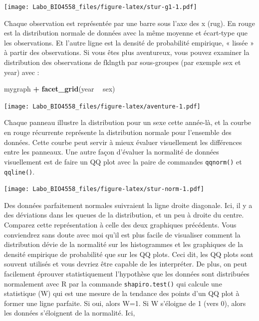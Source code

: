 \documentclass[12pt,]{book}
\newenvironment{Shaded}{\begin{snugshade}}{\end{snugshade}}
\newcommand{\KeywordTok}[1]{\textcolor[rgb]{0.27,0.27,0.27}{\textbf{#1}}}
\newcommand{\NormalTok}[1]{#1}
\newcommand{\OperatorTok}[1]{\textcolor[rgb]{0.43,0.43,0.43}{\textbf{#1}}}
\newcommand{\StringTok}[1]{\textcolor[rgb]{0.5,0.5,0.5}{#1}}
\begin{document}
\texttt{[image: Labo\_BIO4558\_files/figure-latex/stur-g1-1.pdf]}

Chaque observation est représentée par une barre sous l'axe des x (rug).
En rouge est la distribution normale de données avec la même moyenne et écart-type que les observations.
Et l'autre ligne est la densité de probabilité empirique, « lissée » à partir des observations.
Si vous êtes plus aventureux, vous pouvez examiner la distribution des observations de fklngth par sous-groupes (par exemple sex et year) avec :

\begin{Shaded}
\begin{Highlighting}[]
\NormalTok{mygraph }\OperatorTok{+}\StringTok{ }\KeywordTok{facet_grid}\NormalTok{(year }\OperatorTok{~}\StringTok{ }\NormalTok{sex)}
\end{Highlighting}
\end{Shaded}

\texttt{[image: Labo\_BIO4558\_files/figure-latex/aventure-1.pdf]}

Chaque panneau illustre la distribution pour un sexe cette année-là, et la courbe en rouge récurrente représente la distribution normale pour l'ensemble des données.
Cette courbe peut servir à mieux évaluer visuellement les différences entre les panneaux.
Une autre façon d'évaluer la normalité de données visuellement est de faire un QQ plot avec la paire de commandes \texttt{qqnorm()} et \texttt{qqline()}.

\begin{Shaded}
\end{Shaded}

\texttt{[image: Labo\_BIO4558\_files/figure-latex/stur-norm-1.pdf]}

Des données parfaitement normales suivraient la ligne droite diagonale.
Ici, il y a des déviations dans les queues de la distribution, et un peu à droite du centre.
Comparez cette représentation à celle des deux graphiques précédents.
Vous conviendrez sans doute avec moi qu'il est plus facile de visualiser comment la distribution dévie de la normalité sur les histogrammes et les graphiques de la densité empirique de probabilité que sur les QQ plots.
Ceci dit, les QQ plots sont souvent utilisés et vous devriez être capable de les interpréter.
De plus, on peut facilement éprouver statistiquement l'hypothèse que les données sont distribuées normalement avec R par la commande \texttt{shapiro.test()} qui calcule une statistique (W) qui est une mesure de la tendance des points d'un QQ plot à former une ligne parfaite.
Si oui, alors W=1.
Si W s'éloigne de 1 (vers 0), alors les données s'éloignent de la normalité.
Ici,
\end{document}
